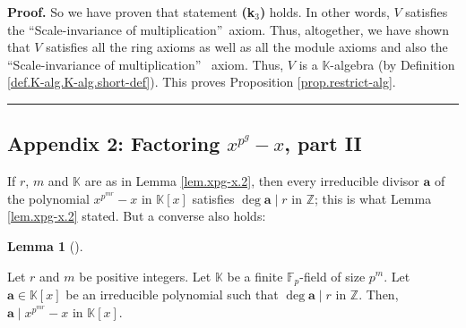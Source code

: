 \documentclass[numbers=enddot,12pt,final,onecolumn,notitlepage]{scrartcl}%
\theoremstyle{definition}
\newtheorem{lem}[theo]{Lemma}
\newenvironment{lemma}[1][]
{\begin{lem}[#1]\begin{leftbar}}
{\end{leftbar}\end{lem}}
\newenvironment{fineprint}{\begin{small}}{\end{small}}
\newenvironment{proof}[1][Proof]{\noindent\textbf{#1.} }{\ \rule{0.5em}{0.5em}}
\begin{document}
\begin{fineprint}
\begin{proof}
So we have proven that statement \textbf{(k}$_{3}$\textbf{)} holds. In other
words, $V$ satisfies the \textquotedblleft Scale-invariance of
multiplication\textquotedblright\ axiom. Thus, altogether, we have shown that
$V$ satisfies all the ring axioms as well as all the module axioms and also
the \textquotedblleft Scale-invariance of multiplication\textquotedblright%
\ axiom. Thus, $V$ is a $\mathbb{K}$-algebra (by Definition
\ref{def.K-alg.K-alg.short-def}). This proves Proposition
\ref{prop.restrict-alg}.
\end{proof}
\end{fineprint}

\subsection{Appendix 2: Factoring $x^{p^{g}}-x$, part II}

If $r$, $m$ and $\mathbb{K}$ are as in Lemma \ref{lem.xpg-x.2}, then every
irreducible divisor $\mathbf{a}$ of the polynomial  $x^{p^{mr}}-x$ in
$\mathbb{K}\left[  x\right]  $ satisfies $\deg\mathbf{a}\mid r$ in
$\mathbb{Z}$; this is what Lemma \ref{lem.xpg-x.2} stated. But a converse also holds:

\begin{lemma}
\label{lem.xpg-x.4}Let $r$ and $m$ be positive integers. Let $\mathbb{K}$ be a
finite $\mathbb{F}_{p}$-field of size $p^{m}$. Let $\mathbf{a}\in
\mathbb{K}\left[  x\right]  $ be an irreducible polynomial such that
$\deg\mathbf{a}\mid r$ in $\mathbb{Z}$. Then, $\mathbf{a}\mid x^{p^{mr}}-x$ in
$\mathbb{K}\left[  x\right]  $.
\end{lemma}
\end{document}
